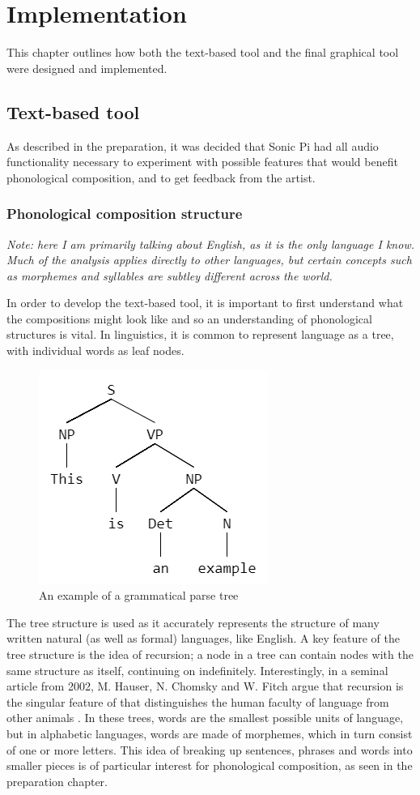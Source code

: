 \documentclass[12pt,a4paper,twoside,openright]{report}
\begin{document}
\chapter{Implementation}
This chapter outlines how both the text-based tool and the final graphical tool were designed and implemented.

\section{Text-based tool}
As described in the preparation, it was decided that Sonic Pi had all audio functionality necessary to experiment with possible features that would benefit phonological composition, and to get feedback from the artist.
\subsection{Phonological composition structure}
\textit{Note: here I am primarily talking about English, as it is the only language I know. Much of the analysis applies directly to other languages, but certain concepts such as morphemes and syllables are subtley different across the world.}

In order to develop the text-based tool, it is important to first understand what the compositions might look like and so an understanding of phonological structures is vital. In linguistics, it is common to represent language as a tree, with individual words as leaf nodes. 
\begin{figure}[h]
    \centering
    \includegraphics[scale=0.5]{images/parse_tree.png}
    \caption{An example of a grammatical parse tree}
    \label{fig:parse_tree}
\end{figure}

The tree structure is used as it accurately represents the structure of many written natural (as well as formal) languages, like English. A key feature of the tree structure is the idea of recursion; a node in a tree can contain nodes with the same structure as itself, continuing on indefinitely. Interestingly, in a seminal article from 2002, M. Hauser, N. Chomsky and W. Fitch argue that recursion is the singular feature of that distinguishes the human faculty of language from other animals \cite{Hauser02}. In these trees, words are the smallest possible units of language, but in alphabetic languages, words are made of morphemes, which in turn consist of one or more letters. This idea of breaking up sentences, phrases and words into smaller pieces is of particular interest for phonological composition, as seen in the preparation chapter.
\end{document}
